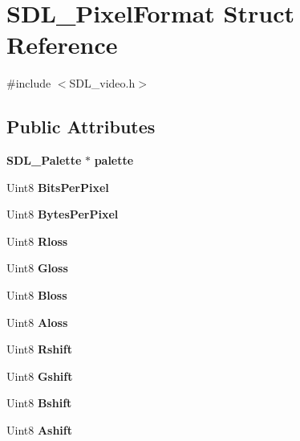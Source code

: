 \section{S\+D\+L\+\_\+\+Pixel\+Format Struct Reference}
\label{struct_s_d_l___pixel_format}


{\ttfamily \#include $<$S\+D\+L\+\_\+video.\+h$>$}

\subsection*{Public Attributes}
\begin{DoxyCompactItemize}
\item 
{\bf S\+D\+L\+\_\+\+Palette} $\ast$ {\bfseries palette}\label{struct_s_d_l___pixel_format_aeae611aba76f5eb11b696807926c5116}

\item 
Uint8 {\bfseries Bits\+Per\+Pixel}\label{struct_s_d_l___pixel_format_aac533fae3043ef44df01108248e111d8}

\item 
Uint8 {\bfseries Bytes\+Per\+Pixel}\label{struct_s_d_l___pixel_format_a6fec9e1809cc3da458d58b8cccd058f2}

\item 
Uint8 {\bfseries Rloss}\label{struct_s_d_l___pixel_format_a9994b4ed87a2551253aebfa191db8424}

\item 
Uint8 {\bfseries Gloss}\label{struct_s_d_l___pixel_format_a94469768d8436e631a13d68623ff663f}

\item 
Uint8 {\bfseries Bloss}\label{struct_s_d_l___pixel_format_a337072c1bc8b41efdd2da4e95b8c2ff7}

\item 
Uint8 {\bfseries Aloss}\label{struct_s_d_l___pixel_format_a660e95097874088292f1289a458efaa2}

\item 
Uint8 {\bfseries Rshift}\label{struct_s_d_l___pixel_format_abfdec7b9ee2ee39db630f4022e4e0daa}

\item 
Uint8 {\bfseries Gshift}\label{struct_s_d_l___pixel_format_a6045012f994c02a86bdc4a91b28d2a3c}

\item 
Uint8 {\bfseries Bshift}\label{struct_s_d_l___pixel_format_a4212574b67529628d8822ed4eb109754}

\item 
Uint8 {\bfseries Ashift}\label{struct_s_d_l___pixel_format_ac3c4ffa0de1f2c94040340deede3bf46}


\end{DoxyCompactItemize}
